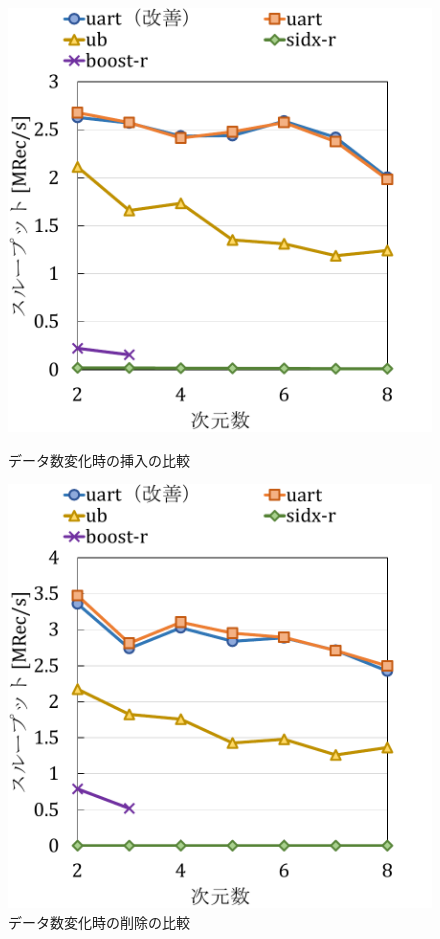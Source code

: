 \begin{figure}[tb]
  \begin{minipage}[c]{0.495\textwidth}
    \centering
    \includegraphics[scale=0.5]{./figures/graph-dimention-insert-0.pdf}
    \caption{データ数変化時の挿入の比較}
    \label{graph:grouped}
  \end{minipage}
  \begin{minipage}[c]{0.495\textwidth}
    \centering
    \includegraphics[scale=0.5]{./figures/graph-dimention-insert-0.5.pdf}
    \caption{データ数変化時の削除の比較}
    \label{graph:paired}
  \end{minipage}
\end{figure}

